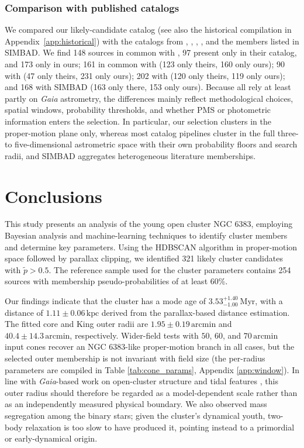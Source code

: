 \documentclass{aa}
\begin{document}
\subsubsection{Comparison with published catalogs}
We compared our likely-candidate catalog (see also the historical compilation in Appendix~\ref{app:historical}) with the catalogs from \citet{2020AA...640A...1C}, \citet{2021ApJ...923..129J}, \citet{2022ApJS..262....7H}, \citet{2024arXiv240305143H}, and the members listed in SIMBAD. We find 148 sources in common with \citet{2020AA...640A...1C}, 97 present only in their catalog, and 173 only in ours; 161 in common with \citet{2021ApJ...923..129J} (123 only theirs, 160 only ours); 90 with \citet{2022ApJS..262....7H} (47 only theirs, 231 only ours); 202 with \citet{2024arXiv240305143H} (120 only theirs, 119 only ours); and 168 with SIMBAD (163 only there, 153 only ours). Because all rely at least partly on \textit{Gaia} astrometry, the differences mainly reflect methodological choices, spatial windows, probability thresholds, and whether PMS or photometric information enters the selection. In particular, our selection clusters in the proper-motion plane only, whereas most catalog pipelines cluster in the full three- to five-dimensional astrometric space with their own probability floors and search radii, and SIMBAD aggregates heterogeneous literature memberships.

\section{Conclusions}\label{sec:conclusion}

This study presents an analysis of the young open cluster NGC 6383, employing Bayesian analysis and machine-learning techniques to identify cluster members and determine key parameters. Using the HDBSCAN algorithm in proper-motion space followed by parallax clipping, we identified 321 likely cluster candidates with $\tilde{p}>0.5$. The reference sample used for the cluster parameters contains 254 sources with membership pseudo-probabilities of at least 60\%.

Our findings indicate that the cluster has a mode age of $3.53^{+1.40}_{-1.00}~\mathrm{Myr}$, with a distance of $1.11 \pm 0.06\,\mathrm{kpc}$ derived from the parallax-based distance estimation. The fitted core and King outer radii are $1.95 \pm 0.19\,\mathrm{arcmin}$ and $40.4 \pm 14.3\,\mathrm{arcmin}$, respectively. Wider-field tests with $50$, $60$, and $70\,\mathrm{arcmin}$ input cones recover an NGC 6383-like proper-motion branch in all cases, but the selected outer membership is not invariant with field size (the per-radius parameters are compiled in Table \ref{tab:cone_params}, Appendix \ref{app:window}). In line with \textit{Gaia}-based work on open-cluster structure and tidal features \citep{2025MNRAS.539.2513A,2025A&A...694A.258R,2025A&A...698A.156X}, this outer radius should therefore be regarded as a model-dependent scale rather than as an independently measured physical boundary. We also observed mass segregation among the binary stars; given the cluster's dynamical youth, two-body relaxation is too slow to have produced it, pointing instead to a primordial or early-dynamical origin.
\end{document}
